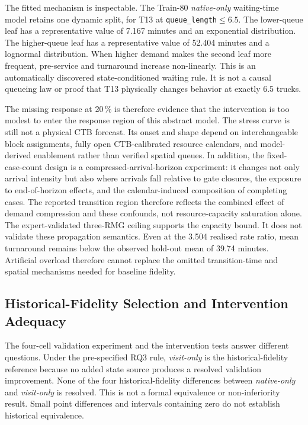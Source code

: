 The fitted mechanism is inspectable. The Train-80 \textit{native-only}
waiting-time model retains one dynamic split, for T13 at
\texttt{queue\_length}$\leq6.5$. The lower-queue leaf has a representative
value of 7.167 minutes and an exponential distribution. The higher-queue leaf
has a representative value of 52.404 minutes and a lognormal distribution.
When higher demand makes the second leaf more frequent, pre-service and
turnaround increase non-linearly. This is an automatically discovered
state-conditioned waiting rule. It is not a causal queueing law or proof that
T13 physically changes behavior at exactly 6.5 trucks.

The missing response at 20\,\% is therefore evidence that the intervention is
too modest to enter the response region of this abstract model. The stress
curve is still not a physical CTB forecast. Its onset and shape depend on
interchangeable block assignments, fully open CTB-calibrated resource calendars,
and model-derived enablement rather than verified spatial queues.  In addition,
the fixed-case-count design is a compressed-arrival-horizon experiment: it
changes not only arrival intensity but also where arrivals fall relative to
gate closures, the exposure to end-of-horizon effects, and the calendar-induced
composition of completing cases.  The reported transition region therefore
reflects the combined effect of demand compression and these confounds, not
resource-capacity saturation alone.  The
expert-validated three-RMG ceiling supports the capacity bound. It does not
validate these propagation semantics. Even at the 3.504 realised rate ratio,
mean turnaround remains below the observed hold-out mean of 39.74 minutes.
Artificial overload therefore cannot replace the omitted transition-time and
spatial mechanisms needed for baseline fidelity.

\subsection{Historical-Fidelity Selection and Intervention Adequacy}

The four-cell validation experiment and the intervention tests answer
different questions. Under the pre-specified RQ3 rule, \textit{visit-only} is
the historical-fidelity reference because no added state source produces a
resolved validation improvement. None of the four historical-fidelity
differences between \textit{native-only} and \textit{visit-only} is resolved.
This is not a formal equivalence or non-inferiority result. Small point
differences and intervals containing zero do not establish historical
equivalence.

